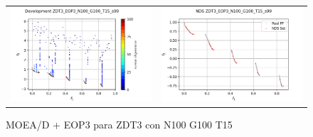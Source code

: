 \begin{figure}[H]
\begin{tabular}{c c}
    \includegraphics[scale=0.45]{figures/ZDT3_EOP3_N100_G100_T15/s99_dev.png} &
    \includegraphics[scale=0.45]{figures/ZDT3_EOP3_N100_G100_T15/s99_nds.png}\\
    \end{tabular}
    \caption{MOEA/D + EOP3 para ZDT3 con N100 G100 T15 }
    \label{fig:2}
\end{figure}

